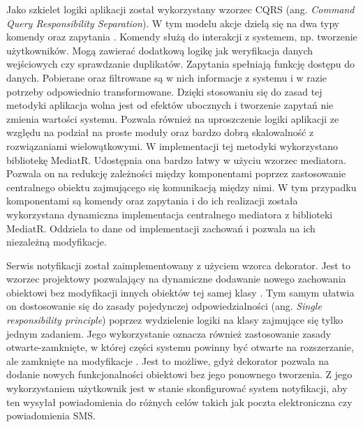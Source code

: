 Jako szkielet logiki aplikacji został wykorzystany wzorzec CQRS 
(ang. \textit{Command Query Responsibility Separation}).
W tym modelu akcje dzielą się na dwa typy komendy oraz zapytania \cite{fowler:cqrs}.
Komendy służą do interakcji z systemem, np. tworzenie użytkowników.
Mogą zawierać dodatkową logikę jak weryfikacja danych wejściowych 
czy sprawdzanie duplikatów.
Zapytania spełniają funkcję dostępu do danych. Pobierane oraz
filtrowane są w nich informacje z systemu i w razie potrzeby
odpowiednio transformowane.
Dzięki stosowaniu się do zasad tej metodyki aplikacja wolna
jest od efektów ubocznych i tworzenie zapytań nie zmienia
wartości systemu. Pozwala również na uproszczenie logiki
aplikacji ze względu na podział na proste moduły oraz bardzo
dobrą skalowalność z rozwiązaniami wielowątkowymi.
W implementacji tej metodyki wykorzystano bibliotekę MediatR.
Udostępnia ona bardzo łatwy w użyciu wzorzec mediatora.
Pozwala on na redukcję zależności między komponentami poprzez
zastosowanie centralnego obiektu zajmującego się komunikacją między nimi\cite{freeman2004head}.
W tym przypadku komponentami są komendy oraz zapytania i do ich realizacji
została wykorzystana dynamiczna implementacja centralnego
mediatora z biblioteki MediatR. Oddziela to dane od implementacji
zachowań i pozwala na ich niezależną modyfikacje.

Serwis notyfikacji został zaimplementowany z użyciem wzorca dekorator.
Jest to wzorzec projektowy pozwalający na dynamiczne dodawanie nowego
zachowania obiektowi bez modyfikacji innych obiektów tej samej klasy
\cite{freeman2004head}. Tym samym ułatwia on dostosowanie się do zasady
pojedynczej odpowiedzialności (ang. \textit{Single responsibility principle})
poprzez wydzielenie logiki na klasy zajmujące się tylko jednym zadaniem.
Jego wykorzystanie oznacza również zastosowanie zasady otwarte-zamknięte, w
której części systemu powinny być otwarte na rozszerzanie, ale zamknięte
na modyfikacje \cite{meyer1988object}. Jest to możliwe, gdyż dekorator pozwala
na dodanie nowych funkcjonalności obiektowi bez jego ponownego tworzenia.
Z jego wykorzystaniem użytkownik jest w stanie skonfigurować system notyfikacji,
aby ten wysyłał powiadomienia do różnych celów takich jak poczta elektroniczna
czy powiadomienia SMS.

